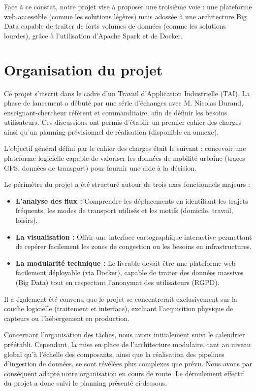 \documentclass[french]{tai_info} %
\begin{document}
Face à ce constat, notre projet vise à proposer une troisième voie : une plateforme web accessible (comme les solutions légères) mais adossée à une architecture Big Data capable de traiter de forts volumes de données (comme les solutions lourdes), grâce à l'utilisation d'Apache Spark et de Docker.

\section{Organisation du projet}

Ce projet s'inscrit dans le cadre d'un Travail d'Application Industrielle (TAI). La phase de lancement a débuté par une série d'échanges avec M. Nicolas Durand, enseignant-chercheur référent et commanditaire, afin de définir les besoins utilisateurs. Ces discussions ont permis d'établir un premier cahier des charges ainsi qu'un planning prévisionnel de réalisation (disponible en annexe).

L'objectif général défini par le cahier des charges était le suivant : concevoir une plateforme logicielle capable de valoriser les données de mobilité urbaine (traces GPS, données de transport) pour fournir une aide à la décision.

Le périmètre du projet a été structuré autour de trois axes fonctionnels majeurs :
\begin{itemize}
    \item \textbf{L'analyse des flux :} Comprendre les déplacements en identifiant les trajets fréquents, les modes de transport utilisés et les motifs (domicile, travail, loisirs).
    \item \textbf{La visualisation :} Offrir une interface cartographique interactive permettant de repérer facilement les zones de congestion ou les besoins en infrastructures.
    \item \textbf{La modularité technique :} Le livrable devait être une plateforme web facilement déployable (via Docker), capable de traiter des données massives (Big Data) tout en respectant l'anonymat des utilisateurs (RGPD).
\end{itemize}

Il a également été convenu que le projet se concentrerait exclusivement sur la couche logicielle (traitement et interface), excluant l'acquisition physique de capteurs ou l'hébergement en production.

Concernant l'organisation des tâches, nous avons initialement suivi le calendrier préétabli. Cependant, la mise en place de l'architecture modulaire, tant au niveau global qu'à l'échelle des composants, ainsi que la réalisation des pipelines d'ingestion de données, se sont révélées plus complexes que prévu. Nous avons par conséquent adapté notre organisation en cours de route. Le déroulement effectif du projet a donc suivi le planning présenté ci-dessous.
\end{document}
